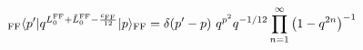 \begin{equation}
 {}_{\rm FF}\langle p' |
  q^{L_0^{\rm FF} + {\tilde L}_0^{\rm FF} - {c_{\rm FF} \over {12}}}
 | p \rangle_{\rm FF}
 = \delta (p'-p) \ q^{p^2} q^{-1/12}
   \prod_{n=1}^\infty \left( 1 - q^{2n} \right)^{-1}
\end{equation}

